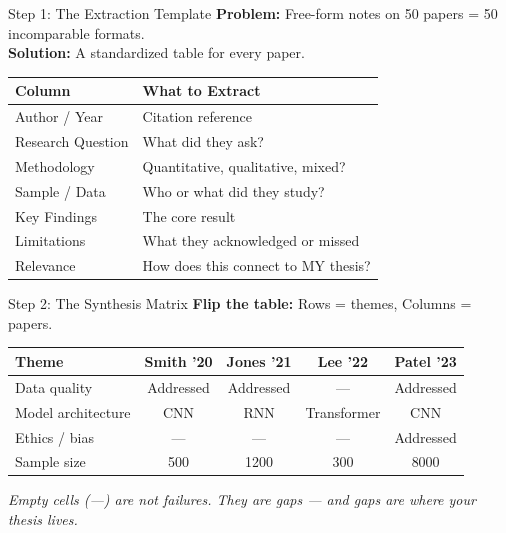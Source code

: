 \documentclass[aspectratio=169]{beamer}
\begin{document}
\begin{frame}{Step 1: The Extraction Template}
  \textbf{Problem:} Free-form notes on 50 papers = 50 incomparable formats.\\
  \textbf{Solution:} A standardized table for every paper.
  \vspace{0.3cm}
  
  \begin{table}
  \footnotesize
  \begin{tabular}{lp{8cm}}
  \toprule
  \textbf{Column} & \textbf{What to Extract} \\
  \midrule
  Author / Year & Citation reference \\
  Research Question & What did they ask? \\
  Methodology & Quantitative, qualitative, mixed? \\
  Sample / Data & Who or what did they study? \\
  Key Findings & The core result \\
  Limitations & What they acknowledged or missed \\
  Relevance & How does this connect to MY thesis? \\
  \bottomrule
  \end{tabular}
  \end{table}
\end{frame}

\begin{frame}{Step 2: The Synthesis Matrix}
  \textbf{Flip the table:} Rows = themes, Columns = papers.
  \vspace{0.3cm}
  
  \begin{table}
  \footnotesize
  \begin{tabular}{l|c|c|c|c}
  \toprule
  \textbf{Theme} & \textbf{Smith '20} & \textbf{Jones '21} & \textbf{Lee '22} & \textbf{Patel '23} \\
  \midrule
  Data quality & Addressed & Addressed & --- & Addressed \\
  Model architecture & CNN & RNN & Transformer & CNN \\
  Ethics / bias & --- & --- & --- & Addressed \\
  Sample size & 500 & 1200 & 300 & 8000 \\
  \bottomrule
  \end{tabular}
  \end{table}
  \vspace{0.2cm}
  \textit{Empty cells (---) are not failures. They are gaps --- and gaps are where your thesis lives.}
\end{frame}
\end{document}
